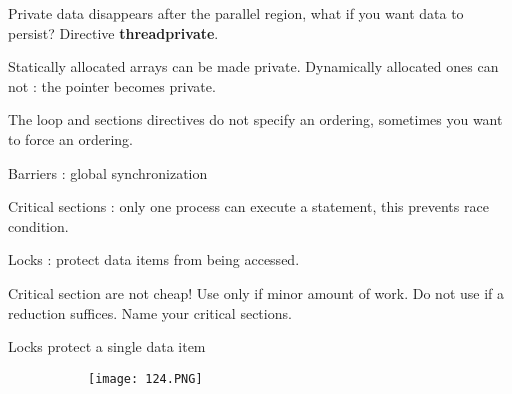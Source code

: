 \documentclass{article}
\begin{document}
Private data disappears after the parallel region, what if you want data to persist? Directive \textbf{threadprivate}.

Statically allocated arrays can be made private. Dynamically allocated ones can not : the pointer becomes private.

The loop and sections directives do not specify an ordering, sometimes you want to force an ordering.

Barriers : global synchronization

Critical sections : only one process can execute a statement, this prevents race condition.

Locks : protect data items from being accessed.

Critical section are not cheap! Use only if minor amount of work. Do not use if a reduction suffices. Name your critical sections.

Locks protect a single data item

\begin{figure}[ht!]
  \centering
  \begin{subfigure}[b]{0.7\linewidth}
    \texttt{[image: 124.PNG]}
  \end{subfigure}
\end{figure}
\end{document}
